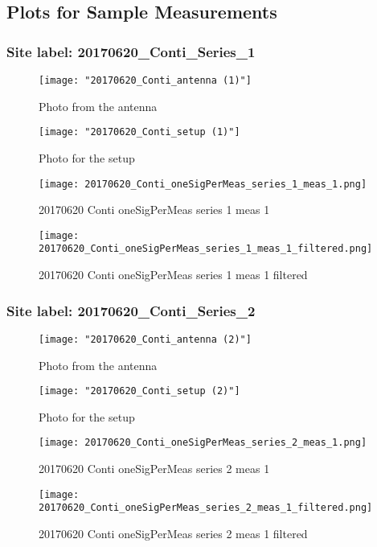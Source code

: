 \subsection{Plots for Sample Measurements}
\subsubsection{Site label: 20170620\_Conti\_Series\_1}
\begin{figure}[ht] \caption{Photo from the antenna}
\texttt{[image: "20170620\_Conti\_antenna (1)"]}\centering\end{figure}
\begin{figure}[ht] \caption{Photo for the setup}
\texttt{[image: "20170620\_Conti\_setup (1)"]}\centering\end{figure}
\begin{figure}[ht] \caption{20170620 Conti oneSigPerMeas series 1 meas 1}
\texttt{[image: 20170620\_Conti\_oneSigPerMeas\_series\_1\_meas\_1.png]}\centering\end{figure}
\begin{figure}[ht] \caption{20170620 Conti oneSigPerMeas series 1 meas 1 filtered}
\texttt{[image: 20170620\_Conti\_oneSigPerMeas\_series\_1\_meas\_1\_filtered.png]}\centering\end{figure}
\clearpage
\subsubsection{Site label: 20170620\_Conti\_Series\_2}
\begin{figure}[ht] \caption{Photo from the antenna}
\texttt{[image: "20170620\_Conti\_antenna (2)"]}\centering\end{figure}
\begin{figure}[ht] \caption{Photo for the setup}
\texttt{[image: "20170620\_Conti\_setup (2)"]}\centering\end{figure}
\begin{figure}[ht] \caption{20170620 Conti oneSigPerMeas series 2 meas 1}
\texttt{[image: 20170620\_Conti\_oneSigPerMeas\_series\_2\_meas\_1.png]}\centering\end{figure}
\begin{figure}[ht] \caption{20170620 Conti oneSigPerMeas series 2 meas 1 filtered}
\texttt{[image: 20170620\_Conti\_oneSigPerMeas\_series\_2\_meas\_1\_filtered.png]}\centering\end{figure}
\clearpage
